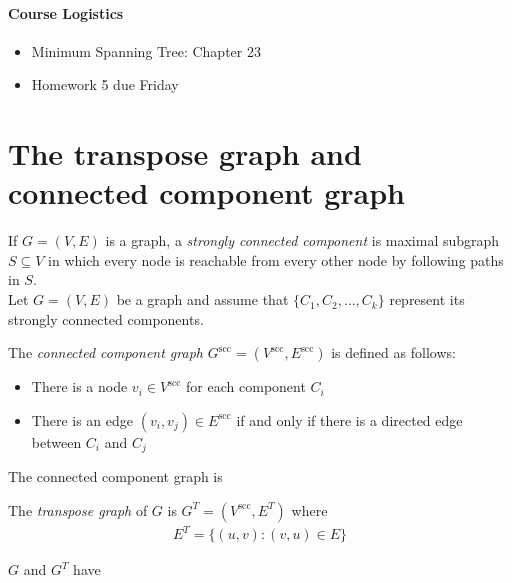 \documentclass[11  pt]{exam}
\begin{document}
	
	
	\paragraph{Course Logistics}
	
	\begin{itemize}
		\item Minimum Spanning Tree: Chapter 23
		\item Homework 5 due Friday
	\end{itemize}
	
	\section{The transpose graph and connected component graph}
	If $G = (V,E)$ is a graph, a \emph{strongly connected component} is maximal subgraph $S \subseteq V$ in which every node is reachable from every other node by following paths in $S$. \\
	
	Let $G = (V,E)$ be a graph and assume that $\{C_1, C_2, \hdots , C_k\}$ represent its strongly connected components. 
	
	The \emph{connected component graph} $G^\text{scc} = (V^\text{scc}, E^\text{scc})$ is defined as follows:
	\begin{itemize}
		\item There is a node $v_i \in V^{\text{scc}}$ for each component $C_i$
		\item There is an edge $(v_i, v_j) \in E^{\text{scc}}$ if and only if there is a directed edge between $C_i$ and $C_j$
	\end{itemize}
	\begin{lemma}
		The connected component graph is 
	\end{lemma}
	
	\vs{5cm}
	
	The \emph{transpose graph} of $G$ is $G^T = (V^\text{scc}, E^T)$ where
	\begin{align*}
		E^T = \{ (u,v) \colon (v,u) \in E\}
	\end{align*}
	
	\begin{lemma}
		$G$ and $G^T$ have \hide{the same strongly }
	\end{lemma}
	
	\newpage
	
	
	
\end{document}
